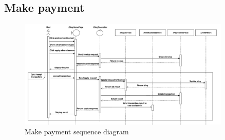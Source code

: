 \subsection{Make payment}

\begin{figure}[H]
    \centering
    \includegraphics[width=0.9\textwidth]{Figures/payment_seq.png}
    \caption{Make payment sequence diagram}
    \label{fig:make-payment-seq}
\end{figure}


